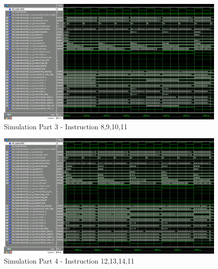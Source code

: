 \begin{figure}[ht]
    \centering
    \includegraphics[scale=0.3]{figures/sim3.png}
    \caption{\label{fig:sim3}Simulation Part 3 - Instruction 8,9,10,11}
\end{figure}

\begin{figure}[ht]
    \centering
    \includegraphics[scale=0.3]{figures/sim4.png}
    \caption{\label{fig:sim4}Simulation Part 4 - Instruction 12,13,14,11}
\end{figure}

